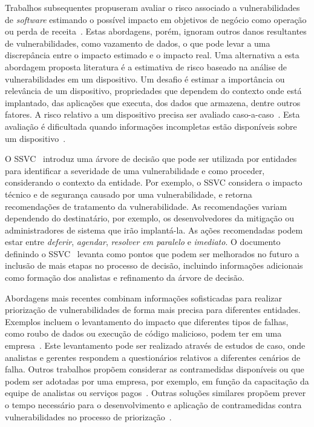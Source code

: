 Trabalhos subsequentes propuseram avaliar o risco associado a vulnerabilidades de \emph{software} estimando o possível impacto em objetivos de negócio como operação ou perda de receita~\cite{manna2020quantitative, varela2019automatic}.  Estas abordagens, porém, ignoram outros danos resultantes de vulnerabilidades, como vazamento de dados, o que pode levar a uma discrepância entre o impacto estimado e o impacto real. Uma alternativa a esta abordagem proposta literatura é a estimativa de risco baseado na análise de vulnerabilidades em um dispositivo. Um desafio é estimar a importância ou relevância de um dispositivo, propriedades que dependem do contexto onde está implantado, das aplicações que executa, dos dados que armazena, dentre outros fatores. A risco relativo a um dispositivo precisa ser avaliado caso-a-caso~\cite{jerman2008towards}.  Esta avaliação é dificultada quando informações incompletas estão disponíveis sobre um dispositivo~\cite{shedden2010information}.

O SSVC~\cite{spring21ssvc} introduz uma árvore de decisão que pode ser utilizada por entidades para identificar a severidade de uma vulnerabilidade e como proceder, considerando o contexto da entidade. Por exemplo, o SSVC considera o impacto técnico e de segurança causado por uma vulnerabilidade, e retorna recomendações de tratamento da vulnerabilidade. As recomendações variam dependendo do destinatário, por exemplo, os desenvolvedores da mitigação ou administradores de sistema que irão implantá-la.  As ações recomendadas podem estar entre \emph{deferir}, \emph{agendar}, \emph{resolver em paralelo} e \emph{imediato}. O documento definindo o SSVC~\cite{spring2019prioritizing} levanta como pontos que podem ser melhorados no futuro a inclusão de mais etapas no processo de decisão, incluindo informações adicionais como formação dos analistas e refinamento da árvore de decisão.

Abordagens mais recentes combinam informações sofisticadas para realizar priorização de vulnerabilidades de forma mais precisa para diferentes entidades. Exemplos incluem o levantamento do impacto que diferentes tipos de falhas, como roubo de dados ou execução de código malicioso, podem ter em uma empresa~\cite{shameli2020efficient}. Este levantamento pode ser realizado através de estudos de caso, onde analistas e gerentes respondem a questionários relativos a diferentes cenários de falha. Outros trabalhos propõem considerar as contramedidas disponíveis ou que podem ser adotadas por uma empresa, por exemplo, em função da capacitação da equipe de analistas ou serviços pagos~\cite{tamjidi2023intelligence}. Outras soluções similares propõem prever o tempo necessário para o desenvolvimento e aplicação de contramedidas contra vulnerabilidades no processo de priorização~\cite{sheng2022vpnet}.

